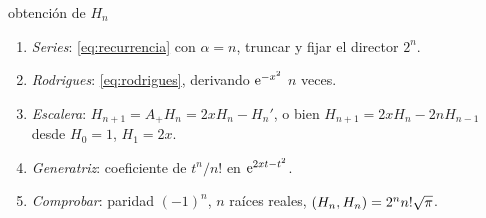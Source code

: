\documentclass[11pt,a4paper,twoside]{article}
\newcommand{\Ap}{A_{+}}
\begin{document}
\begin{metodo}{obtención de $H_n$}
\begin{enumerate}
\item \emph{Series}: \eqref{eq:recurrencia} con $\alpha=n$, truncar y fijar el director $2^n$.
\item \emph{Rodrigues}: \eqref{eq:rodrigues}, derivando $\mathrm{e}^{-x^2}$ $n$ veces.
\item \emph{Escalera}: $H_{n+1}=\Ap H_n=2xH_n-H_n'$, o bien $H_{n+1}=2xH_n-2nH_{n-1}$ desde $H_0=1$, $H_1=2x$.
\item \emph{Generatriz}: coeficiente de $t^n/n!$ en $\mathrm{e}^{2xt-t^2}$.
\item \emph{Comprobar}: paridad $(-1)^n$, $n$ raíces reales, $\left(H_n,H_n\right)=2^nn!\sqrt\pi$.
\end{enumerate}
\end{metodo}

\clearpage
\end{document}
